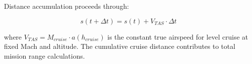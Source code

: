 Distance accumulation proceeds through:

\begin{equation}
s(t + \Delta t) = s(t) + V_{TAS} \cdot \Delta t
\end{equation}

where $V_{TAS} = M_{cruise} \cdot a(h_{cruise})$ is the constant true airspeed for level cruise at fixed Mach and altitude. The cumulative cruise distance contributes to total mission range calculations.
